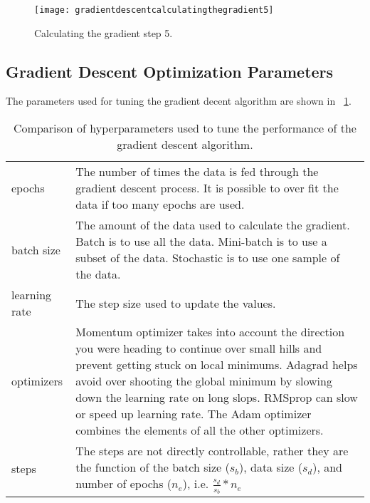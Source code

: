  	\begin{figure}[htb]
		\centering
		\texttt{[image: gradientdescentcalculatingthegradient5]}
		\caption[Calculating the gradient step 5]{Calculating the gradient step 5.}
		\label{fig:gradientdescentcalculatingthegradient5}
	\end{figure}

	\subsection{Gradient Descent Optimization Parameters}
The parameters used for tuning the gradient decent algorithm are shown in \tablename~\ref{tab:gradientdescentoptimization}.

    \begin{table}
        \centering
        \caption[Hyperparameters of the gradient descent algorithm]{Comparison of hyperparameters used to tune the performance of the gradient descent algorithm.}
        \label{tab:gradientdescentoptimization}
		\begin{tabular}{|l|p{}|} \hline
				\tablecolumnheadervlinesone{Parameter} & \tablecolumnheadervlinestwo{Description} \\ \hline
				epochs &
	            The number of times the data is fed through the gradient descent process.  It is possible to over fit the data if too many epochs are used. \\ \hline
				batch size &
				The amount of the data used to calculate the gradient.  Batch is to use all the data.  Mini-batch is to use a subset of the data.  Stochastic is to use one sample of the data. \\ \hline
				learning rate &
				The step size used to update the values. \\ \hline
				optimizers &
				Momentum optimizer takes into account the direction you were heading to continue over small hills and prevent getting stuck on local minimums.  Adagrad helps avoid over shooting the global minimum by slowing down the learning rate on long slops.  RMSprop can slow or speed up learning rate.  The Adam optimizer combines the elements of all the other optimizers. \\ \hline
				steps &
				The steps are not directly controllable, rather they are the function of the batch size ($s_b$), data size ($s_d$), and number of epochs ($n_e$), i.e. $\frac{s_d}{s_b}*n_e$ \\ \hline
		\end{tabular}
	\end{table}

